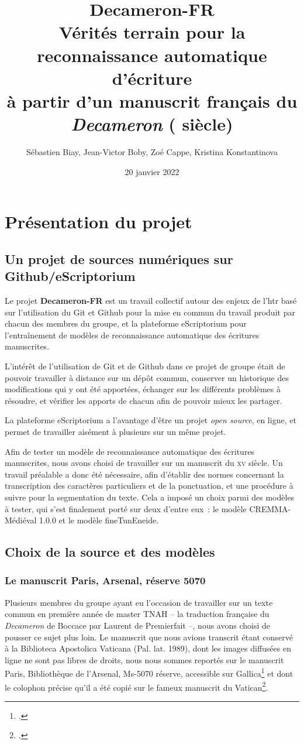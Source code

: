 \documentclass{article}
\title{Decameron-FR \\ \small Vérités terrain pour la reconnaissance automatique d'écriture \\ à partir d'un manuscrit français du \textit{Decameron} (\siecle{xv} siècle)}
\author{Sébastien Biay, Jean-Victor Boby, Zoé Cappe, Kristina Konstantinova}
\date{20 janvier 2022}
\newcommand{\siecle}[1]{\textsc{#1}\ieme}
\begin{document}
\maketitle

\section{Présentation du projet}
\subsection{Un projet de sources numériques sur Github/eScriptorium}
Le projet \textbf{Decameron-FR} est un travail collectif autour des enjeux de l'\gls{htr} basé sur l’utilisation du Git et Github pour la mise en commun du travail produit par chacun des membres du groupe, et la plateforme eScriptorium pour l’entraînement de modèles de reconnaissance automatique des écritures manuscrites. 

L’intérêt de l’utilisation de Git et de Github dans ce projet de groupe était de pouvoir travailler à distance sur un dépôt commun, conserver un historique des modifications qui y ont été apportées, échanger sur les différents problèmes à résoudre, et vérifier les apports de chacun afin de pouvoir mieux les partager.

La plateforme eScriptorium a l’avantage d’être un projet \textit{open source}, en ligne, et permet de travailler aisément à plusieurs sur un même projet.

Afin de tester un modèle de reconnaissance automatique des écritures manuscrites, nous avons choisi de travailler sur un manuscrit du \siecle{xv} siècle. Un travail préalable a donc été nécessaire, afin d’établir des normes concernant la transcription des caractères particuliers et de la ponctuation, et une procédure à suivre pour la segmentation du texte. Cela a imposé un choix parmi des modèles à tester, qui s’est finalement porté sur deux d’entre eux~: le modèle CREMMA-Médiéval 1.0.0 et le modèle fineTunEneide.

\subsection{Choix de la source et des modèles}

\subsubsection{Le manuscrit Paris, Arsenal, réserve 5070}
Plusieurs membres du groupe ayant eu l'occasion de travailler sur un texte commun en première année de master TNAH – la traduction française du \textit{Decameron} de Boccace par Laurent de Premierfait –, nous avons choisi de pousser ce sujet plus loin.
Le manuscrit que nous avions transcrit étant conservé à la Biblioteca Apostolica Vaticana (Pal. lat. 1989), dont les images diffusées en ligne ne sont pas libres de droits, nous nous sommes reportés sur le manuscrit Paris, Bibliothèque de l'Arsenal, Ms-5070 réserve, accessible sur Gallica\footcite{gallicaParisBibliothequeArsenal, bnfarchivesetmanuscritsMs5070BoccaceDecameron} et dont le colophon précise qu'il a été copié sur le fameux manuscrit du Vatican\footcite{jonas-irhtParisBibliothequeArsenal2012}.
\end{document}

